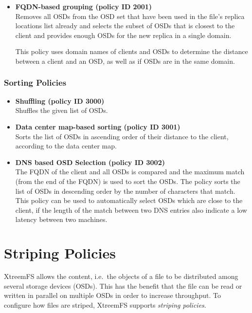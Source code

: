 \documentclass[a4paper,10pt]{book}
\begin{document}
\begin{itemize}
 \item \textbf{FQDN-based grouping (policy ID 2001)}\\
 Removes all OSDs from the OSD set that have been used in the file's replica locations list already and selects the subset of OSDs that is closest to the client and provides enough OSDs for the new replica in a single domain.

This policy uses domain names of clients and OSDs to determine the distance between a client and an OSD, as well as if OSDs are in the same domain.

\end{itemize}

\subsubsection{Sorting Policies}

\begin{itemize}

 \item \textbf{Shuffling (policy ID 3000)}\\
 Shuffles the given list of OSDs.

 \item \textbf{Data center map-based sorting (policy ID 3001)}\\
 Sorts the list of OSDs in ascending order of their distance to the client, according to the data center map.

 \item \textbf{DNS based OSD Selection (policy ID 3002)}\\
 The FQDN of the client and all OSDs is compared and the maximum match (from the end of the FQDN) is used to sort the OSDs. The policy sorts the list of OSDs in descending order by the number of characters that match. This policy can be used to automatically select OSDs which are close to the client, if the length of the match between two DNS entries also indicate a low latency between two machines.

\end{itemize}

\section{Striping Policies} \label{sec:striping_policies}

XtreemFS allows the content, i.e.\ the objects of a file to be distributed among several storage devices (OSDs). This has the benefit that the file can be read or written in parallel on multiple OSDs in order to increase throughput. To configure how files are striped, XtreemFS supports \emph{striping policies}.
\end{document}
